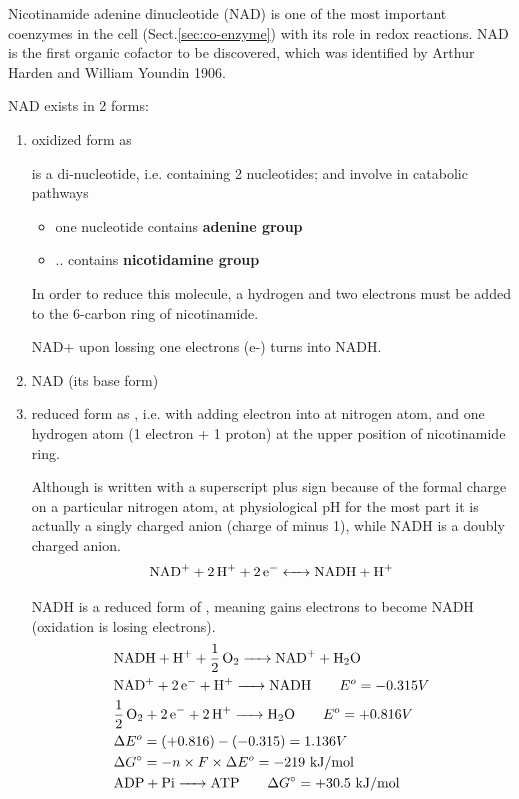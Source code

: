 Nicotinamide adenine dinucleotide (NAD) is one of the most important coenzymes
in the cell (Sect.\ref{sec:co-enzyme}) with its role in redox reactions.  NAD is
the first organic cofactor to be discovered, which was identified by Arthur
Harden and William Youndin 1906.

NAD exists in 2 forms:
\begin{enumerate}
  \item oxidized form as 

{\bf {}} is a di-nucleotide, i.e. containing 2 nucleotides; and involve in
catabolic pathways
\begin{itemize}
  \item one nucleotide contains {\bf adenine group}
  \item .. contains {\bf nicotidamine group}
\end{itemize}
In order to reduce this molecule, a hydrogen and two electrons must be added to
the 6-carbon ring of nicotinamide.
  
NAD+ upon lossing one electrons (e-) turns into NADH.

  
  \item NAD (its base form)
  
  \item reduced form as , i.e. with adding electron into  at
  nitrogen atom, and one hydrogen atom (1 electron + 1 proton) at the upper
  position of nicotinamide ring.
  

\begin{mdframed}
Although  is written with a superscript plus sign because of the formal
charge on a particular nitrogen atom, at physiological pH for the most part it
is actually a singly charged anion (charge of minus 1), while NADH is a doubly
charged anion.
\begin{equation}
\ce{NAD+ + 2H+ + 2e- <-> NADH + H+}
\end{equation}


NADH is a reduced form of , meaning  gains electrons to become
NADH (oxidation is losing electrons).
\begin{equation}
\begin{split}
&\ce{NADH + H+ + 1/2 O2 -> NAD+ + H2O}  \\
&\ce{NAD+ + 2e- + H+ -> NADH } \qquad  E^o = -0.315 V \\
&\ce{1/2O2 + 2e- + 2H+ -> H2O} \qquad E^o = +0.816 V \\
&\Delta E^o = (+0.816) - (-0.315) = 1.136 V \\
&\Delta G^{\circ} = - n \times F \times \Delta E^o = -219 \text{ kJ/mol} \\
&\ce{ADP + Pi -> ATP } \qquad \Delta G^{\circ} = +30.5 \text{ kJ/mol}
\end{split}
\end{equation}


\end{mdframed}
\end{enumerate}
